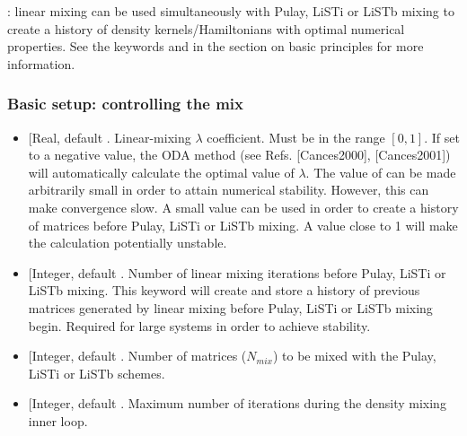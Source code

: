 \documentclass[letterpaper,10pt,english]{sphinxmanual}
\begin{document}
: linear mixing can be used simultaneously with Pulay, LiSTi or
LiSTb mixing to create a history of density kernels/Hamiltonians with
optimal numerical properties. See the keywords  and
 in the section on basic principles  for more information.


\subsubsection{Basic setup: controlling the mix}
\label{\detokenize{onetep_kernel_diis_documentation:basic-setup-controlling-the-mix}}\begin{itemize}
\item {} 
 {[}Real, default
\sphinxcode{kernel\_diis\_coeff: 0.1}{]}. Linear-mixing \(\lambda\)
coefficient. Must be in the range \(\left[0,1\right]\). If set to
a negative value, the ODA method (see Refs.
{[}Cances2000{]}, {[}Cances2001{]}) will automatically calculate
the optimal value of \(\lambda\). The value of
 can be made arbitrarily small in order to
attain numerical stability. However, this can make convergence slow.
A small value can be used in order to create a history of matrices
before Pulay, LiSTi or LiSTb mixing. A value close to 1 will make the
calculation potentially unstable.

\item {} 
 {[}Integer, default
\sphinxcode{kernel\_diis\_linear\_iter: 5}{]}. Number of linear mixing iterations
before Pulay, LiSTi or LiSTb mixing. This keyword will create and
store a history of  previous matrices generated by linear mixing
before Pulay, LiSTi or LiSTb mixing begin. Required for large systems
in order to achieve stability.

\item {} 
 {[}Integer, default
\sphinxcode{kernel\_diis\_size: 10}{]}. Number of matrices (\(N_{mix}\)) to be
mixed with the Pulay, LiSTi or LiSTb schemes.

\item {} 
 {[}Integer, default
\sphinxcode{kernel\_diis\_maxit: 25}{]}. Maximum number of iterations during the
density mixing inner loop.

\end{itemize}
\end{document}
